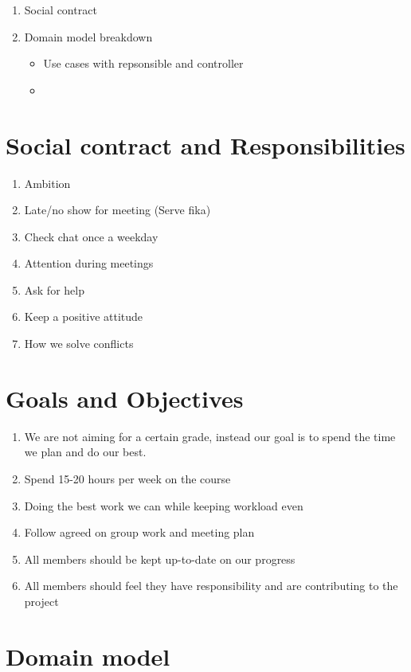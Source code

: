 \begin{enumerate}
\item Social contract
\item Domain model breakdown
\begin{itemize}
\item Use cases with repsonsible and controller
\item 
\end{itemize}
\end{enumerate}

\section{Social contract and Responsibilities}
\begin{enumerate}
    \item Ambition
    \item Late/no show for meeting (Serve fika)
    \item Check chat once a weekday
    \item Attention during meetings
    \item Ask for help
    \item Keep a positive attitude
    \item How we solve conflicts
\end{enumerate}

\section{Goals and Objectives}
\begin{enumerate}
    \item We are not aiming for a certain grade, instead our goal is to spend the time we plan and do our best.
    \item Spend 15-20 hours per week on the course
    \item Doing the best work we can while keeping workload even
    \item Follow agreed on group work and meeting plan
    \item All members should be kept up-to-date on our progress
    \item All members should feel they have responsibility and are contributing to the project
\end{enumerate}

\section{Domain model}

